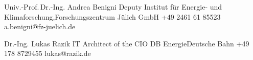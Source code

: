 \begin{cvReferences}

\cvRefereeNameOne%
    {Univ.-Prof.\,Dr.-Ing. Andrea Benigni}%
    {Deputy}%
    {Institut f{\"u}r Energie- und Klimaforschung,\newline Forschungszentrum J{\"u}lich GmbH}%
    {+49 2461 61 85523}%
    {a.benigni@fz-juelich.de}%

\cvRefereeNameTwo%
    {Dr.-Ing. Lukas Razik}%
    {IT Architect of the CIO}%
    {DB Energie\newline Deutsche Bahn}%
    {+49 178 8729455}%
    {lukas@razik.de}%

\cvRefereeFlush



\end{cvReferences}   
